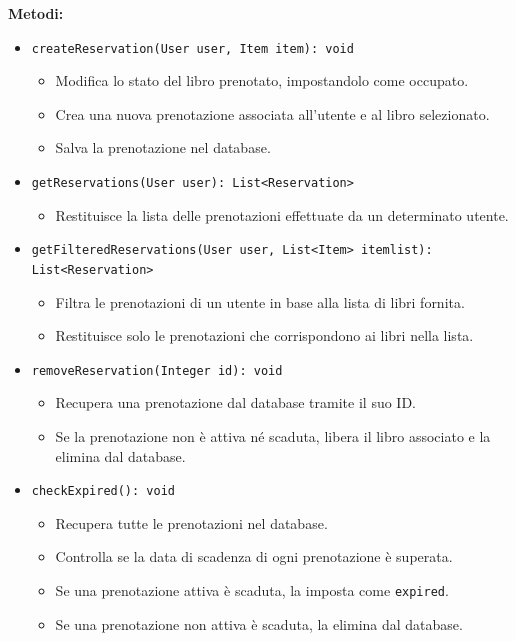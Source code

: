 \documentclass[twoside,openright,titlepage,fleqn,headinclude,12pt,a4paper,BCOR=5mm,footinclude]{scrbook}
\begin{document}
\textbf{Metodi:}  
\begin{itemize}  
    \item \texttt{createReservation(User user, Item item): void}  
    \begin{itemize}  
        \item Modifica lo stato del libro prenotato, impostandolo come occupato.  
        \item Crea una nuova prenotazione associata all’utente e al libro selezionato.  
        \item Salva la prenotazione nel database.  
    \end{itemize}  

    \item \texttt{getReservations(User user): List<Reservation>}  
    \begin{itemize}  
        \item Restituisce la lista delle prenotazioni effettuate da un determinato utente.  
    \end{itemize}  

    \item \texttt{getFilteredReservations(User user, List<Item> itemlist): List<Reservation>}  
    \begin{itemize}  
        \item Filtra le prenotazioni di un utente in base alla lista di libri fornita.  
        \item Restituisce solo le prenotazioni che corrispondono ai libri nella lista.  
    \end{itemize}  

    \item \texttt{removeReservation(Integer id): void}  
    \begin{itemize}  
        \item Recupera una prenotazione dal database tramite il suo ID.  
        \item Se la prenotazione non è attiva né scaduta, libera il libro associato e la elimina dal database.  
    \end{itemize}  

    \item \texttt{checkExpired(): void}  
    \begin{itemize}  
        \item Recupera tutte le prenotazioni nel database.  
        \item Controlla se la data di scadenza di ogni prenotazione è superata.  
        \item Se una prenotazione attiva è scaduta, la imposta come \texttt{expired}.  
        \item Se una prenotazione non attiva è scaduta, la elimina dal database.  
    \end{itemize}  


\end{itemize}
\end{document}
